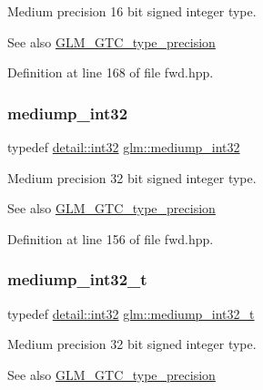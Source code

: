 Medium precision 16 bit signed integer type. \begin{DoxySeeAlso}{See also}
\mbox{\hyperlink{group__gtc__type__precision}{G\+L\+M\+\_\+\+G\+T\+C\+\_\+type\+\_\+precision}} 
\end{DoxySeeAlso}


Definition at line 168 of file fwd.\+hpp.

\mbox{\label{group__gtc__type__precision_ga0660a752402702f420f13c686a7fff29}} 
\subsubsection{\texorpdfstring{mediump\_int32}{mediump\_int32}}
{\footnotesize\ttfamily typedef \mbox{\hyperlink{namespaceglm_1_1detail_a9f85b4efeca416cdcec2fd08939a2e17}{detail\+::int32}} \mbox{\hyperlink{group__gtc__type__precision_ga0660a752402702f420f13c686a7fff29}{glm\+::mediump\+\_\+int32}}}

Medium precision 32 bit signed integer type. \begin{DoxySeeAlso}{See also}
\mbox{\hyperlink{group__gtc__type__precision}{G\+L\+M\+\_\+\+G\+T\+C\+\_\+type\+\_\+precision}} 
\end{DoxySeeAlso}


Definition at line 156 of file fwd.\+hpp.

\mbox{\label{group__gtc__type__precision_gafd9b4bd9e4465aec63351b59100692c4}} 
\subsubsection{\texorpdfstring{mediump\_int32\_t}{mediump\_int32\_t}}
{\footnotesize\ttfamily typedef \mbox{\hyperlink{namespaceglm_1_1detail_a9f85b4efeca416cdcec2fd08939a2e17}{detail\+::int32}} \mbox{\hyperlink{group__gtc__type__precision_gafd9b4bd9e4465aec63351b59100692c4}{glm\+::mediump\+\_\+int32\+\_\+t}}}

Medium precision 32 bit signed integer type. \begin{DoxySeeAlso}{See also}
\mbox{\hyperlink{group__gtc__type__precision}{G\+L\+M\+\_\+\+G\+T\+C\+\_\+type\+\_\+precision}} 
\end{DoxySeeAlso}


